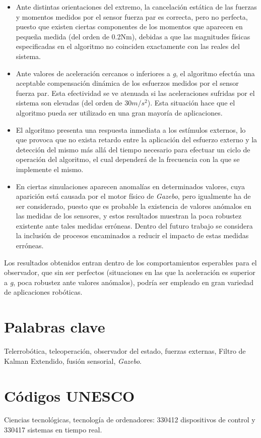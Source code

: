 \begin{itemize}

\item Ante distintas orientaciones del extremo, la cancelación estática de las fuerzas y momentos medidos por el sensor fuerza par es correcta, pero no perfecta, puesto que existen ciertas componentes de los momentos que aparecen en pequeña medida (del orden de 0.2Nm), debidas a que las magnitudes físicas especificadas en el algoritmo no coinciden exactamente con las reales del sistema. \par 

\item Ante valores de aceleración cercanos o inferiores a \emph{g}, el algoritmo efectúa una aceptable compensación dinámica de los esfuerzos medidos por el sensor fuerza par. Esta efectividad se ve atenuada si las aceleraciones sufridas por el sistema son elevadas (del orden de $30 m/{s^2}$). Esta situación hace que el algoritmo pueda ser utilizado en una gran mayoría de aplicaciones. \par 

\item El algoritmo presenta una respuesta inmediata a los estímulos externos, lo que provoca que no exista retardo entre la aplicación del esfuerzo externo y la detección del mismo más allá del tiempo necesario para efectuar un ciclo de operación del algoritmo, el cual dependerá de la frecuencia con la que se implemente el mismo. \par 

\item En ciertas simulaciones aparecen anomalías en determinados valores, cuya aparición está causada por el motor físico de \emph{Gazebo}, pero igualmente ha de ser considerado, puesto que es probable la existencia de valores anómalos en las medidas de los sensores, y estos resultados muestran la poca robustez existente ante tales medidas erróneas. Dentro del futuro trabajo se considera la inclusión de procesos encaminados a reducir el impacto de estas medidas erróneas. \par 

\end{itemize}

Los resultados obtenidos entran dentro de los comportamientos esperables para el observador, que sin ser perfectos (situaciones en las que la aceleración es superior a \emph{g}, poca robustez ante valores anómalos), podría ser empleado en gran variedad de aplicaciones robóticas. \par  


\section*{Palabras clave}

Telerrobótica, teleoperación, observador del estado, fuerzas externas, Filtro de Kalman Extendido, fusión sensorial, \emph{Gazebo}.

\section*{Códigos UNESCO}

Ciencias tecnológicas, tecnología de ordenadores: 330412 dispositivos de control y 330417 sistemas en tiempo real.
